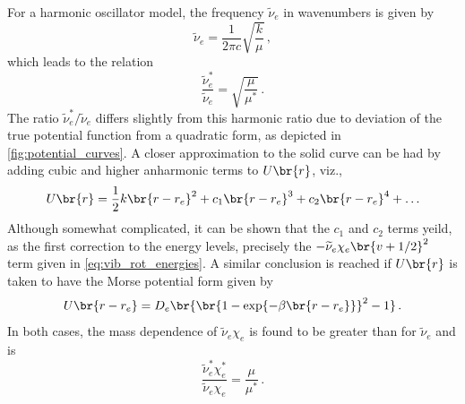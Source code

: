 \documentclass[nobib,nofonts,nols,nohyper]{tufte-handout}
\begin{document}
For a harmonic oscillator model, the frequency \( \widetilde{\nu}_e \) in wavenumbers is given by 
\begin{equation}
	\widetilde{\nu}_e = \frac{1}{2 \pi c} \sqrt{\frac{k}{\mu}} \, ,
	\label{eq:ho_freq}
\end{equation}
which leads to the relation 
\begin{equation}
	\frac{\widetilde{\nu}_e^*}{\widetilde{\nu}_e} = \sqrt{\frac{\mu}{\mu^*}}\, .
	\label{eq:ho_freq_relation}
\end{equation}
The ratio \( \widetilde{\nu}_e^* / \widetilde{\nu}_e \) differs slightly from this harmonic ratio due to deviation of the true potential function from a quadratic form, as depicted in \cref{fig:potential_curves}. 
A closer approximation to the solid curve can be had by adding cubic and higher anharmonic terms to \( U\br{r} \), viz.,
\begin{equation}
	U\br{r} = \frac{1}{2} k \br{r - r_e}^2 + c_1 \br{r - r_e}^3 + c_2 \br{r - r_e}^4 + \ldots
	\label{eq:anharmonic_expansion}
\end{equation}
Although somewhat complicated, it can be shown\autocite{herzberg89,levine75} that the \( c_1 \) and \( c_2 \) terms yeild, as the first correction to the energy levels, precisely the \( -\widetilde{\nu}_e \chi_e \br{v + {1}/{2}}^2 \) term given in \cref{eq:vib_rot_energies}. 
A similar conclusion is reached if \( U\br{r} \) is taken to have the Morse potential form given by%
\begin{equation}
	U\br{r - r_e} = D_e \br{\br{1 - \exp{-\beta\br{r - r_e}}}^2 - 1} \, .
	\label{eq_morse_potential}
\end{equation}
In both cases, the mass dependence of \( \widetilde{\nu}_e \chi_e \) is found to be greater than for \( \widetilde{\nu}_e \) and is
\begin{equation}
	\frac{\widetilde{\nu}_e^* \chi_e^*}{\widetilde{\nu}_e \chi_e } = \frac{\mu}{\mu^*} \, .
	\label{eq:ve_isotope_relation}
\end{equation}
\end{document}
